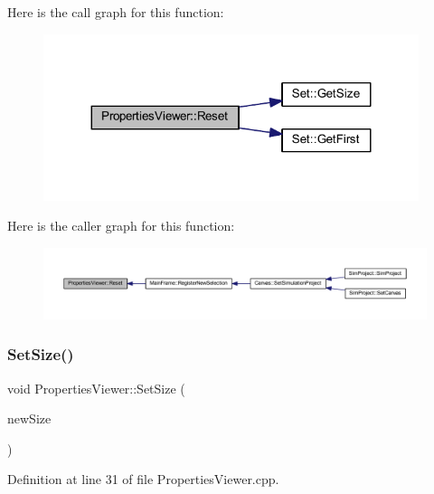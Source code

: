 Here is the call graph for this function\+:
\nopagebreak
\begin{figure}[H]
\begin{center}
\leavevmode
\includegraphics[width=311pt]{class_properties_viewer_a610dc708815ecdc748c2898551f086c0_cgraph}
\end{center}
\end{figure}
Here is the caller graph for this function\+:
\nopagebreak
\begin{figure}[H]
\begin{center}
\leavevmode
\includegraphics[width=350pt]{class_properties_viewer_a610dc708815ecdc748c2898551f086c0_icgraph}
\end{center}
\end{figure}
\mbox{\label{class_properties_viewer_a584378c78158525069fccc64ba446821}} 
\subsubsection{\texorpdfstring{Set\+Size()}{SetSize()}}
{\footnotesize\ttfamily void Properties\+Viewer\+::\+Set\+Size (\begin{DoxyParamCaption}\item[{wx\+Size}]{new\+Size }\end{DoxyParamCaption})}



Definition at line 31 of file Properties\+Viewer.\+cpp.

